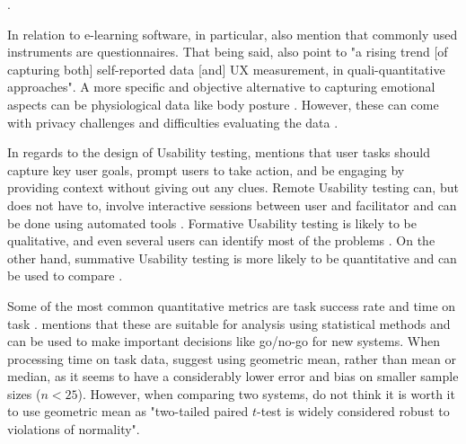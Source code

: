 .

In relation to e-learning software, in particular, \textcite{Darin_et_all_2019} also mention that commonly used instruments are questionnaires.
That being said, \textcite[p. 60]{Darin_et_all_2019} also point to "a rising trend [of capturing both] self-reported data [and] UX measurement, in quali-quantitative approaches".
A more specific and objective alternative to capturing emotional aspects can be physiological data like body posture \parencite{Tan_Schöning_Luyten_Coninx_2013}.
However, these can come with privacy challenges and difficulties evaluating the data \parencite{Juergen_et_all_2020}.

In regards to the design of Usability testing, \textcite{McCloskey_2014} mentions that user tasks should capture key user goals, prompt users to take action, and be engaging by providing context without giving out any clues.
Remote Usability testing can, but does not have to, involve interactive sessions between user and facilitator and can be done using automated tools \parencite{Moran_2019}.
Formative Usability testing is likely to be qualitative, and even several users can identify most of the problems \parencite{Lewis_2014,Moran_2019}.
On the other hand, summative Usability testing is more likely to be quantitative and can be used to compare \parencite{Macefield_2009, Moran_2019}.

Some of the most common quantitative metrics are task success rate and time on task \parencite{Macefield_2009, Moran_2019}.
\textcite{Macefield_2009} mentions that these are suitable for analysis using statistical methods and can be used to make important decisions like go/no-go for new systems.
When processing time on task data, \textcite{sauro_chapter3_2016} suggest using geometric mean, rather than mean or median, as it seems to have a considerably lower error and bias on smaller sample sizes ($n < 25$).
However, when comparing two systems, \textcite{sauro_chapter5_2016} do not think it is worth it to use geometric mean as "two-tailed paired $t$-test is widely considered robust to violations of normality".

